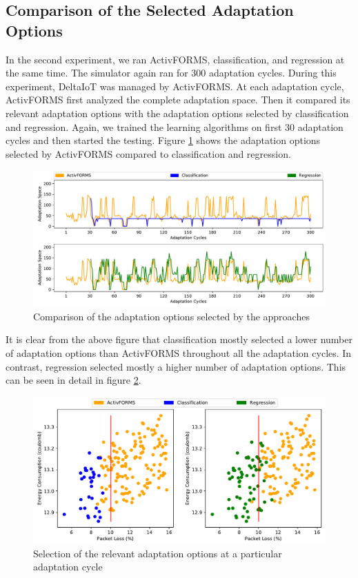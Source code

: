 \documentclass[a4paper,12pt]{article}
\begin{document}
\subsection{Comparison of the Selected Adaptation Options}
In the second experiment, we ran ActivFORMS, classification, and regression at the same time. The simulator again ran for 300 adaptation cycles. During this experiment, DeltaIoT was managed by ActivFORMS. At each adaptation cycle, ActivFORMS first analyzed the complete adaptation space. Then it compared its relevant adaptation options with the adaptation options selected by classification and regression. Again, we trained the learning algorithms on first 30 adaptation cycles and then started the testing. Figure \ref{OnlineLearning} shows the adaptation options selected by ActivFORMS compared to classification and regression.
\begin{figure}[H]
    \centering
    \includegraphics[keepaspectratio, width=\linewidth]{graphs/OnlineLearning.pdf}
    \caption{Comparison of the adaptation options selected by the approaches}
    \label{OnlineLearning}
\end{figure}
It is clear from the above figure that classification mostly selected a lower number of adaptation options than ActivFORMS throughout all the adaptation cycles. In contrast, regression selected mostly a higher number of adaptation options. This can be seen in detail in figure \ref{RelevantOptions}.
\begin{figure}[H]
    \centering
    \includegraphics[keepaspectratio, width=\linewidth]{graphs/SelectedAdaptationOptions.pdf}
    \caption{Selection of the relevant adaptation options at a particular adaptation cycle}
    \label{RelevantOptions}
\end{figure}
\end{document}
